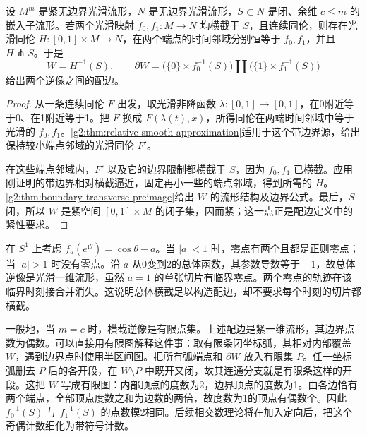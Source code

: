 \begin{theorem}\label{g2:thm:transverse-homotopy-cobordism}
	设 \(M^m\) 是紧无边界光滑流形，\(N\) 是无边界光滑流形，\(S\subset N\) 是闭、余维 \(c\le m\) 的嵌入子流形。若两个光滑映射 \(f_0,f_1:M\to N\) 均横截于 \(S\)，且连续同伦，则存在光滑同伦 \(H:[0,1]\times M\to N\)，在两个端点的时间邻域分别恒等于 \(f_0,f_1\)，并且 \(H\pitchfork S\)。于是
	\[
		W=H^{-1}(S),\qquad
		\partial W=\bigl(\{0\}\times f_0^{-1}(S)\bigr)
		\amalg\bigl(\{1\}\times f_1^{-1}(S)\bigr)
	\]
	给出两个逆像之间的配边。
\end{theorem}
\begin{proof}
	从一条连续同伦 \(F\) 出发，取光滑非降函数 \(\lambda:[0,1]\to[0,1]\)，在0附近等于0、在1附近等于1。把 \(F\) 换成 \(F(\lambda(t),x)\)，所得同伦在两端时间邻域中等于光滑的 \(f_0,f_1\)。\cref{g2:thm:relative-smooth-approximation}适用于这个带边界源，给出保持较小端点邻域的光滑同伦 \(F'\)。

	在这些端点邻域内，\(F'\) 以及它的边界限制都横截于 \(S\)，因为 \(f_0,f_1\) 已横截。应用刚证明的带边界相对横截逼近，固定再小一些的端点邻域，得到所需的 \(H\)。\cref{g2:thm:boundary-transverse-preimage}给出 \(W\) 的流形结构及边界公式。最后，\(S\) 闭，所以 \(W\) 是紧空间 \([0,1]\times M\) 的闭子集，因而紧；这一点正是配边定义中的紧性要求。
\end{proof}

\begin{example}\label{g2:exm:zeros-appear-in-pairs}
	在 \(S^1\) 上考虑 \(f_a(e^{\mathrm i\theta})=\cos\theta-a\)。当 \(|a|<1\) 时，零点有两个且都是正则零点；当 \(|a|>1\) 时没有零点。沿 \(a\) 从0变到2的总体函数，其参数导数等于 \(-1\)，故总体逆像是光滑一维流形，虽然 \(a=1\) 的单张切片有临界零点。两个零点的轨迹在该临界时刻接合并消失。这说明总体横截足以构造配边，却不要求每个时刻的切片都横截。
\end{example}

一般地，当 \(m=c\) 时，横截逆像是有限点集。上述配边是紧一维流形，其边界点数为偶数。可以直接用有限图解释这件事：取有限条闭坐标弧，其相对内部覆盖 \(W\)，遇到边界点时使用半区间图。把所有弧端点和 \(\partial W\) 放入有限集 \(P\)。任一坐标弧删去 \(P\) 后的各开段，在 \(W\setminus P\) 中既开又闭，故其连通分支就是有限条这样的开段。这把 \(W\) 写成有限图：内部顶点的度数为2，边界顶点的度数为1。由各边恰有两个端点，全部顶点度数之和为边数的两倍，故度数为1的顶点有偶数个。因此 \(f_0^{-1}(S)\) 与 \(f_1^{-1}(S)\) 的点数模2相同。后续相交数理论将在加入定向后，把这个奇偶计数细化为带符号计数。
